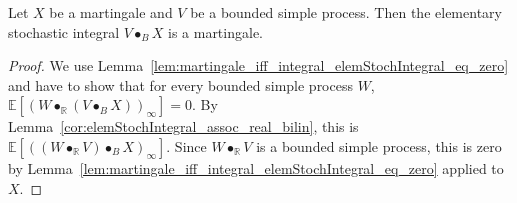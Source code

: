 \begin{lemma}\label{lem:Martingale.elemStochIntegral}
Let $X$ be a martingale and $V$ be a bounded simple process.
Then the elementary stochastic integral $V \bullet_B X$ is a martingale.
\end{lemma}

\begin{proof}
We use Lemma~\ref{lem:martingale_iff_integral_elemStochIntegral_eq_zero} and have to show that for every bounded simple process $W$, $\mathbb{E}[(W \bullet_{\mathbb{R}} (V \bullet_B X))_\infty] = 0$.
By Lemma~\ref{cor:elemStochIntegral_assoc_real_bilin}, this is $\mathbb{E}[((W \bullet_{\mathbb{R}} V) \bullet_B X)_\infty]$.
Since $W \bullet_{\mathbb{R}} V$ is a bounded simple process, this is zero by Lemma~\ref{lem:martingale_iff_integral_elemStochIntegral_eq_zero} applied to $X$.
\end{proof}
